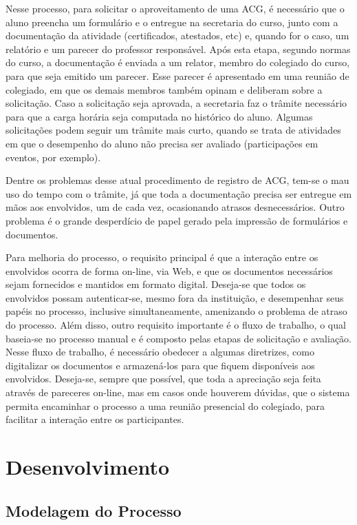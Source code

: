 \documentclass[12pt]{article}
\begin{document}
Nesse processo, para solicitar o aproveitamento de uma ACG, é necessário que o aluno preencha um formulário e o entregue na secretaria do curso, junto com a documentação da atividade (certificados, atestados, etc) e, quando for o caso, um relatório e um parecer do professor responsável. Após  esta  etapa,  segundo normas do curso, a documentação é enviada a um relator, membro do colegiado do curso, para que seja emitido um parecer. Esse parecer é apresentado em uma reunião de colegiado, em que os demais membros também opinam e deliberam sobre a solicitação. Caso a solicitação seja  aprovada, a secretaria faz o trâmite necessário para que a carga horária seja computada no histórico do aluno. Algumas solicitações podem seguir um trâmite mais curto, quando se trata de atividades em que o desempenho do aluno não precisa ser avaliado (participações em eventos, por exemplo).

Dentre os problemas desse atual procedimento de registro de ACG, tem-se o mau uso do tempo com o trâmite, já que toda a documentação precisa ser entregue em mãos aos envolvidos, um de cada vez, ocasionando atrasos desnecessários. Outro problema é o grande desperdício de papel gerado pela impressão de formulários e documentos.

Para melhoria do processo, o requisito principal é que a interação entre os envolvidos ocorra de forma on-line, via Web, e que os documentos necessários sejam fornecidos e mantidos em formato digital. Deseja-se que todos os envolvidos possam autenticar-se, mesmo fora da instituição, e desempenhar seus papéis no processo, inclusive simultaneamente, amenizando o problema de atraso do processo. Além disso, outro requisito importante é o fluxo de trabalho, o qual baseia-se no processo manual e é composto pelas etapas de solicitação e avaliação. Nesse fluxo de trabalho, é necessário obedecer a algumas diretrizes, como digitalizar os documentos e armazená-los para que fiquem disponíveis aos envolvidos. Deseja-se, sempre que possível, que toda a apreciação seja feita através de pareceres on-line, mas em casos onde houverem dúvidas, que o sistema permita encaminhar o processo a uma reunião presencial do colegiado, para facilitar a interação entre os participantes.

\section{Desenvolvimento}

\subsection{Modelagem do Processo}
\end{document}
